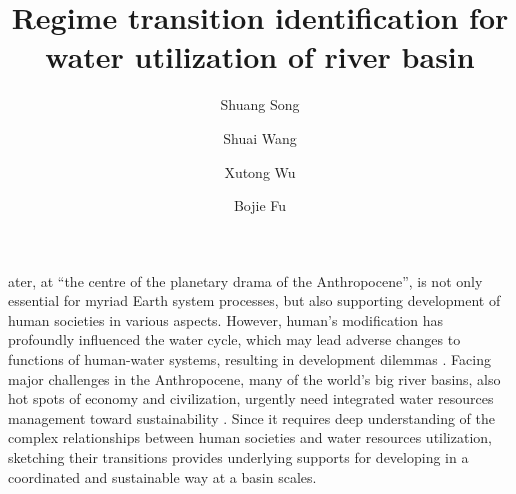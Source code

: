 \documentclass[9pt, twocolumn, twoside, lineno]{pnas-new}
\title{Regime transition identification for water utilization of river basin}
\author[a, b]{Shuang Song}  %
\author[a, b, 1]{Shuai Wang}  %
\author[c, d]{Xutong Wu}  %
\author[a, b]{Bojie Fu}  %
\affil[a]{ %
	State Key Laboratory of Earth Surface Processes and Resource Ecology, 
	Faculty of Geographical Science, 
	Beijing Normal University, 
	Beijing 100875, 
	P.R. China
}
\affil[b]{ %
	Institute of Land Surface System and Sustainability, 
	Faculty of Geographical Science, 
	Beijing Normal University, 
	Beijing 100875, 
	P.R. China
}
\affil[c]{ %
	College of Urban and Environmental Sciences, 
	Peking University, 
	Beijing 100871, 
	P.R. China
}
\affil[d]{ %
	State Key Laboratory of Urban and Regional Ecology, 
	Research Center for Eco-Environmental Sciences, 
	Chinese Academy of Sciences, 
	Beijing 100085, 
	P.R. China 
}
\begin{document}
\maketitle
\thispagestyle{firststyle}

\label{introduction}
ater, at “the centre of the planetary drama of the Anthropocene”, is not only essential for myriad Earth system processes, but also supporting development of human societies in various aspects. 
However, human's modification has profoundly influenced the water cycle, which may lead adverse changes to functions of human-water systems, resulting in development dilemmas \cite{gleesonIlluminatingWaterCycle2020,cummingLinkingEconomicGrowth2018}.
Facing major challenges in the Anthropocene, many of the world's big river basins, also hot spots of economy and civilization, urgently need integrated water resources management toward sustainability \cite{bestAnthropogenicStressesWorld2019}. 
Since it requires deep understanding of the complex relationships between human societies and water resources utilization, sketching their transitions provides underlying supports for developing in a coordinated and sustainable way at a basin scales.
\end{document}
